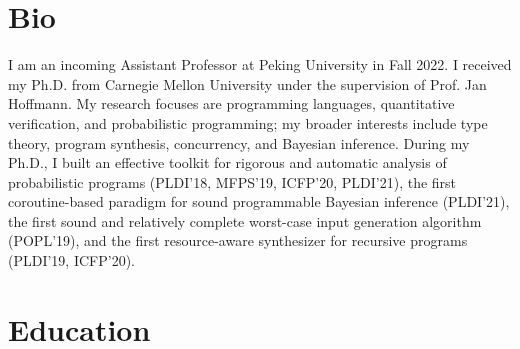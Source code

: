 \documentclass[11pt,letterpaper,roman]{moderncv}        %
\begin{document}
\makecvtitle


\section{Bio}

I am an incoming Assistant Professor at Peking University in Fall 2022.
%
I received my Ph.D. from Carnegie Mellon University under the supervision of
Prof. Jan Hoffmann.
%
My research focuses are programming languages,
quantitative verification,
and probabilistic programming;
my broader interests include type theory, program synthesis, concurrency, and
Bayesian inference.
%
During my Ph.D.,
I built an effective toolkit for rigorous and automatic analysis of probabilistic
programs (PLDI'18, MFPS'19, ICFP'20, PLDI'21),
the first coroutine-based paradigm for sound programmable Bayesian inference (PLDI'21),
the first sound and relatively complete worst-case input generation algorithm (POPL'19),
and the first resource-aware synthesizer for recursive programs (PLDI'19, ICFP'20).

\section{Education}

  {}

  \vspace{4pt}

  {}
\end{document}
